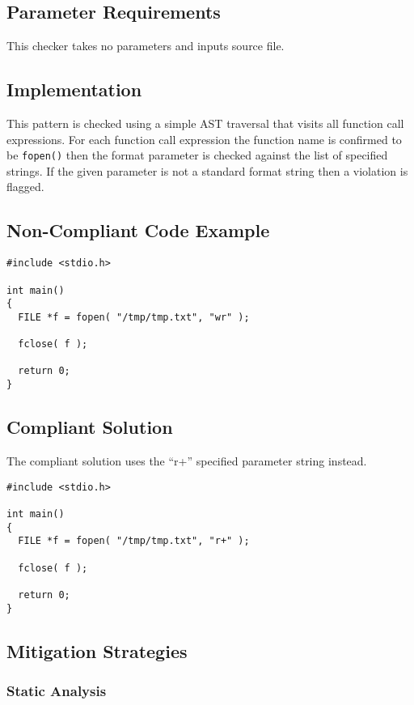 \subsection{Parameter Requirements}
This checker takes no parameters and inputs source file.

\subsection{Implementation}
This pattern is checked using a simple AST traversal that visits all function call expressions. For each function call expression the function name is confirmed to be {\tt fopen()} then the format parameter is checked against the list of specified strings. If the given parameter is not a standard format string then a violation is flagged.

\subsection{Non-Compliant Code Example}

\begin{verbatim}
#include <stdio.h>

int main()
{
  FILE *f = fopen( "/tmp/tmp.txt", "wr" );

  fclose( f );

  return 0;
}
\end{verbatim}

\subsection{Compliant Solution}
The compliant solution uses the ``r+'' specified parameter string instead.

\begin{verbatim}
#include <stdio.h>

int main()
{
  FILE *f = fopen( "/tmp/tmp.txt", "r+" );

  fclose( f );

  return 0;
}
\end{verbatim}

\subsection{Mitigation Strategies}
\subsubsection{Static Analysis} 

